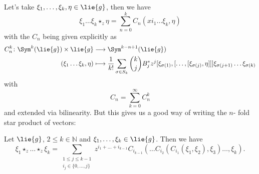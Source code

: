 Let's take $\xi_1, \ldots, \xi_k, \eta \in \lie{g}$, then we have
\begin{equation*}
	\xi_1 \ldots \xi_k \star_z \eta
	=
	\sum\limits_{n = 0}^k 
	C_n \left( xi_1 \ldots \xi_k, \eta \right)
\end{equation*}
with  the $C_n$ being given explicitly as
\begin{align}
	\label{Formulas:MultipleStarDef1}
	C_n^k
	\colon
	\Sym^k(\lie{g})
	\times
	\lie{g}
	& 
	\longrightarrow
	\Sym^{k - n + 1}(\lie{g})
	\\
	\label{Formulas:MultipleStarDef2}
	(\xi_1 \ldots \xi_k, \eta)
	&
	\longmapsto
	\frac{1}{k!}
	\sum\limits_{\sigma \in S_k}
	\binom{k}{j} B_j^* z^j
	[\xi_{\sigma(1)}, [ \ldots, [\xi_{\sigma(j)}, \eta]]] 
	\xi_{\sigma(j + 1)} \ldots \xi_{\sigma(k)}
\end{align}
with
\begin{equation*}
	C_n 
	= 
	\sum\limits_{k = 0}^{\infty}
	C_n^k
\end{equation*}
and extended via bilinearity. But this gives us a good way of writing the $n$-
fold star product of vectors:
\begin{proposition}
	\label{Formulas:Prop:MultipleStars}
	Let $\lie{g}$, $2 \leq k \in \mathbb{N}$  and $\xi_1, \ldots, \xi_k 
	\in \lie{g}$. Then we have
	\begin{equation}
		\label{Formulas:MultipleStars}
		\xi_1 \star_z \ldots \star_z \xi_k		
		=
		\sum\limits_{\substack{
			1 \leq j \leq k-1 \\
			i_j \in \{0, \ldots, j\}
		}}
		z^{i_1 + \ldots + i_{k-1}}
		C_{i_{k-1}}
		\left(
			\ldots C_{i_2}
			\left(
				C_{i_1}
				\left( \xi_1, \xi_2 \right)
				, \xi_3	
			\right) 
			\ldots, \xi_{k}
		\right).
	\end{equation}
\end{proposition}
